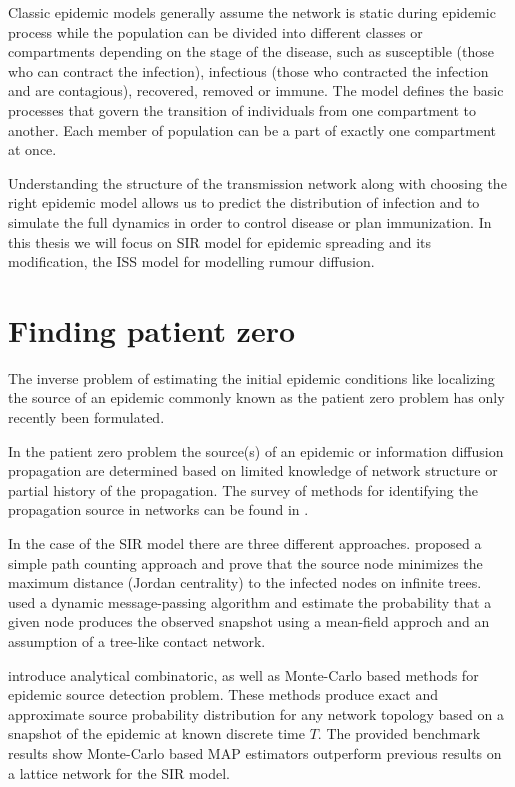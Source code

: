 \documentclass[times, utf8, diplomski]{fer}
\begin{document}
 Classic epidemic models generally  assume the network is static during epidemic process while the population can be divided into different classes or compartments depending on the stage of the disease, such as susceptible (those who can contract the infection), infectious (those who contracted the infection and are contagious), recovered,  removed or immune. The model defines the basic processes that govern the transition of individuals from one compartment to another.
 Each member of population can be a part of exactly one compartment at once. 
 
 Understanding the structure of the transmission network along with choosing the right epidemic model allows us to predict the distribution of infection and to simulate the full dynamics in order to control disease or plan immunization. In this thesis we will focus on SIR model for epidemic spreading and its modification, the ISS model for modelling rumour diffusion. 

\section{Finding patient zero}  
The inverse problem of estimating the initial epidemic conditions like localizing the source of an epidemic commonly known as the patient zero problem has only recently been formulated.

In the patient zero problem the source(s) of an epidemic or information diffusion propagation are determined based on limited knowledge of network structure or partial history of the propagation. The survey of methods for identifying the propagation source in networks can be found in \citet{soa_source}.

In the case of the SIR model there are three different approaches. \citet{Zhu} proposed a simple path counting approach and prove that the source node minimizes the maximum distance (Jordan centrality) to the infected nodes on infinite trees. \citet{Lohkov} used a dynamic message-passing algorithm and estimate the probability that a given node produces the observed snapshot using a mean-field approch and an assumption of a tree-like contact network.

\citet{Nino} introduce analytical combinatoric, as well as Monte-Carlo based methods for epidemic source detection problem. These methods produce exact and approximate source probability distribution for any network topology based on a snapshot of the epidemic at known discrete time $T$. The provided benchmark results show Monte-Carlo based MAP estimators outperform previous results on a lattice network for the SIR model. 
\end{document}
